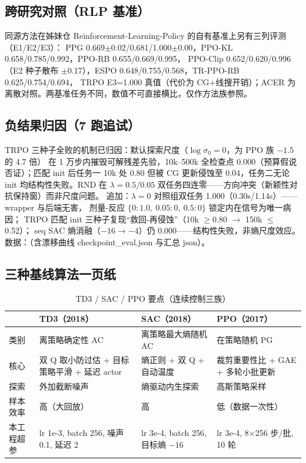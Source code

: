 \subsection{跨研究对照（RLP 基准）}
同源方法在姊妹仓 Reinforcement-Learning-Policy 的自有基准上另有三列评测（E1/E2/E3）：
PPG 0.669$\pm$0.02/0.681/1.000$\pm$0.00，PPO-KL 0.658/0.785/0.992，PPO-RB 0.655/0.669/0.995，
PPO-Clip 0.652/0.620/0.996（E2 种子散布 $\pm$0.17），ESPO 0.648/0.755/0.568，TR-PPO-RB 0.625/0.754/0.694，
TRPO E3=1.000 真值（代价为 CG+线搜开销）；ACER 为离散对照。两基准任务不同，数值不可直接横比，仅作方法族参照。

\subsection{负结果归因（7 跑追试）}
TRPO 三种子全败的机制已归因：默认探索尺度（$\log\sigma_0{=}0$，为 PPO 族 $-1.5$ 的 4.7 倍）
在 1 万步内摧毁可解残差先验，10k--500k 全检查点 0.000（预算假说否证）；匹配 init 后任务一
10k 处 0.80 但被 CG 更新侵蚀至 0.04，任务二无论 init 均结构性失败。RND 在
$\lambda{=}0.5/0.05$ 双任务四连零——方向冲突（新颖性对抗保持窗）而非尺度问题。
追加：$\lambda{=}0$ 对照组双任务 1.000（0.30s/1.14s）——wrapper 与后端无害，
剂量-反应 $\{0{:}1.0,\ 0.05{:}0,\ 0.5{:}0\}$ 锁定内在信号为唯一病因；
TRPO 匹配 init 三种子复现“救回-再侵蚀”（10k $\geq$0.80 $\to$ 150k $\leq$0.52）；
seq SAC 熵消融（$-16 \to -4$）仍 0.000——结构性失败，非熵尺度效应。
数据：（含漂移曲线 checkpoint\_eval.json 与汇总 json）。

\subsection{三种基线算法一页纸}
\begin{table}[h]\centering\small
\caption{TD3 / SAC / PPO 要点（连续控制三族）}\label{tab:three}
\begin{tabular}{p{2.4cm}p{4.4cm}p{4.4cm}p{3.4cm}}
\toprule
 & TD3（2018） & SAC（2018） & PPO（2017） \\
\midrule
类别 & 离策略确定性 AC & 离策略最大熵随机 AC & 在策略随机 PG \\
核心 & 双 Q 取小防过估 + 目标策略平滑 + 延迟 actor & 熵正则 + 双 Q + 自动温度 & 裁剪重要性比 + GAE + 多轮小批更新 \\
探索 & 外加截断噪声 & 熵驱动内生探索 & 高斯策略采样 \\
样本效率 & 高（大回放） & 高 & 低（数据一次性） \\
本工程超参 & lr 1e-3, batch 256, 噪声 0.1, 延迟 2 & lr 3e-4, batch 256, 目标熵 $-16$ & lr 3e-4, 8$\times$256 步/批, 10 轮 \\
\bottomrule
\end{tabular}
\end{table}

